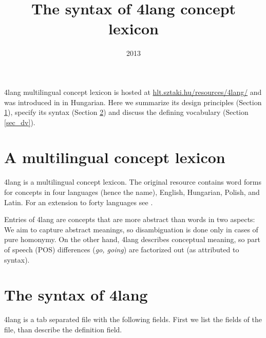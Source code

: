 \documentclass[a4paper,10pt]{article}
\title{The syntax of 4lang concept lexicon}
\date{2013}
\begin{document}
\maketitle
4lang multilingual concept lexicon is hosted at \url{hlt.sztaki.hu/resources/4lang/} and was introduced in \cite{Kornai:2013} in Hungarian. Here we summarize its design principles (Section \ref{sec_principles}), specify its syntax (Section \ref{sec_synt}) and discuss the defining vocabulary (Section \ref{sec_dv}).
\section{A multilingual concept lexicon}\label{sec_principles}
4lang is a multilingual concept lexicon. The original resource contains word forms for concepts in four languages (hence the name), English, Hungarian, Polish, and Latin. For an extension to forty languages see \cite{Acs:2013}.

Entries of 4lang are concepts that are more abstract than words in two aspects: We aim to capture abstract meanings, so disambiguation is done only in cases of pure homonymy. On the other hand, 4lang describes conceptual meaning, so part of speech (POS) differences (\emph{go, going}) are factorized out (as attributed to syntax).
\section{The syntax of 4lang}\label{sec_synt}
4lang is a tab separated file with the following fields. First we list the fields of the file, than describe the definition field.
\end{document}
